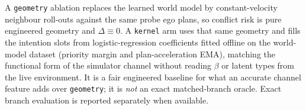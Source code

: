 \documentclass[conference]{IEEEtran}
\begin{document}
A \texttt{geometry} ablation replaces the learned world model by constant-velocity neighbour roll-outs against the same probe ego plans, so conflict risk is pure engineered geometry and $\Delta\equiv 0$. A \texttt{kernel} arm uses that same geometry and fills the intention slots from logistic-regression coefficients fitted offline on the world-model dataset (priority margin and plan-acceleration EMA), matching the functional form of the simulator channel without reading $\beta$ or latent types from the live environment. It is a fair engineered baseline for what an accurate channel feature adds over \texttt{geometry}; it is \emph{not} an exact matched-branch oracle. Exact branch evaluation is reported separately when available.
\end{document}
